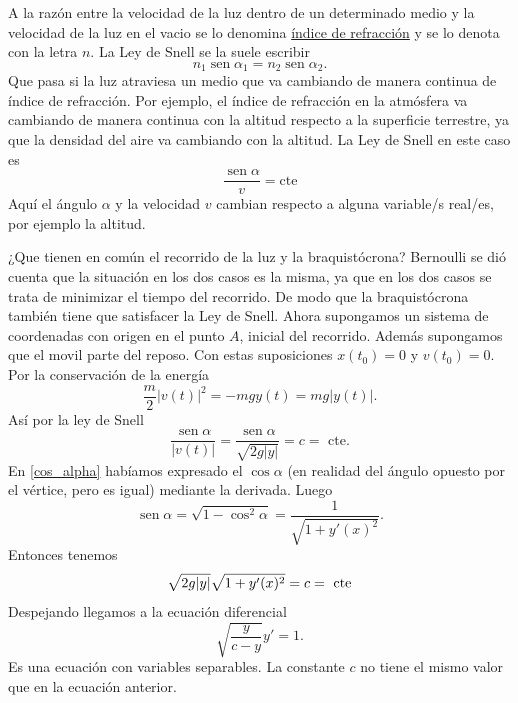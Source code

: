 \documentclass{article}
\DeclareMathOperator{\sen}{sen}
\newcounter{ejemplo_cont}
\begin{document}
 A la razón entre la velocidad de la luz dentro de un determinado medio y la velocidad de la luz en el vacio se lo denomina
\href{http://es.wikipedia.org/wiki/Índice_de_refracción}{índice de refracción} y se lo denota con la letra $n$. La Ley de Snell se la suele escribir
\[\boxed{n_1\sen\alpha_1=n_2\sen\alpha_2 }.\]
Que pasa si la luz atraviesa un medio que va cambiando de manera continua de índice de refracción. Por ejemplo, el índice de refracción en la atmósfera
va cambiando de manera continua con la altitud respecto a la superficie terrestre, ya que la densidad del aire va cambiando con la altitud. La Ley de
Snell en este caso es
\[\boxed{\frac{\sen\alpha}{v}=\text{cte}}\]
Aquí el ángulo $\alpha$ y la velocidad $v$ cambian respecto a alguna variable/s real/es, por ejemplo la altitud.


¿Que tienen en común el recorrido de la luz y la braquistócrona? Bernoulli se dió cuenta que la situación en los dos casos es la misma, ya que en los dos casos
se trata de minimizar el tiempo del recorrido. De modo que la braquistócrona también tiene que satisfacer la Ley de Snell.
 Ahora supongamos un sistema de coordenadas con origen en el punto $A$, inicial del recorrido.  Además supongamos que el movil  parte
del reposo. Con estas suposiciones $x(t_0)=0$ y $v(t_0)=0$. Por la conservación de la energía 
\[\frac{m}{2}|v(t)|^2=-mgy(t)=mg|y(t)|.\]
 Así por la ley de Snell
\[\frac{\sen\alpha}{|v(t)|}=\frac{\sen\alpha}{\sqrt{2g|y|}}=c=\text{ cte}.\]
En \eqref{cos_alpha} habíamos expresado el $\cos\alpha$ (en realidad del ángulo opuesto por el vértice, pero es igual) mediante la derivada. Luego
\[\sen\alpha=\sqrt{1-\cos^2\alpha}=\frac{1}{\sqrt{1+y'(x)^2}}.\]
Entonces tenemos
\[\sqrt{2g|y|}\sqrt{1+y'(x)^2}=c=\hbox{ cte}\]
Despejando llegamos a la ecuación diferencial
\[\boxed{\sqrt{\frac{y}{c-y}}y'=1}.\]
Es una ecuación con variables separables. La constante $c$ no tiene el mismo valor que en la ecuación anterior.  
\end{document}
